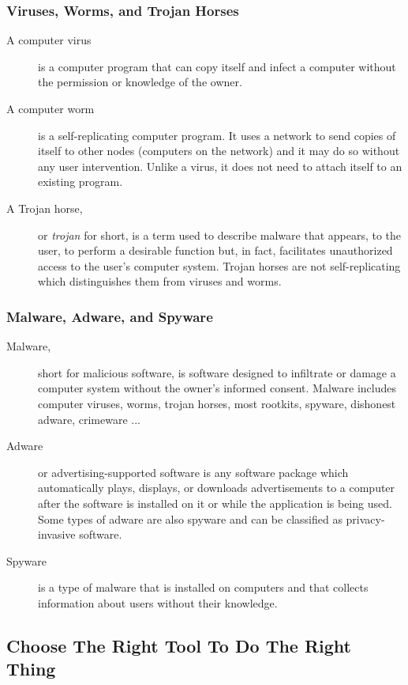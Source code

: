 \documentclass[hyperref={xetex,colorlinks,linkcolor=blue},green,compress]{beamer}
\begin{document}
\begin{frame}\frametitle{Viruses, Worms, and Trojan Horses}

\begin{description}
\item[A computer virus] is a computer program that can copy itself and infect a computer without the permission or knowledge of the owner.
\item[A computer worm] is a self-replicating computer program. It uses a network to send copies of itself to other nodes (computers on the network) and it may do so without any user intervention. Unlike a virus, it does not need to attach itself to an existing program.
\item[A Trojan horse,] or \emph{trojan} for short, is a term used to describe malware that appears, to the user, to perform a desirable function but, in fact, facilitates unauthorized access to the user's computer system. Trojan horses are not self-replicating which distinguishes them from viruses and worms. 
\end{description}

\end{frame}

\begin{frame}\frametitle{Malware, Adware, and Spyware}

\begin{description}
\item[Malware,] short for malicious software, is software designed to infiltrate or damage a computer system without the
  owner's informed consent. Malware includes computer viruses, worms, trojan horses, most rootkits, spyware, dishonest
  adware, crimeware ...
\item[Adware] or advertising-supported software is any software package which automatically plays, displays, or downloads advertisements to a computer after the software is installed on it or while the application is being used. Some types of adware are also spyware and can be classified as privacy-invasive software.
\item[Spyware] is a type of malware that is installed on computers and that collects information about users without their knowledge.
\end{description}

\end{frame}

\subsection[Browsers]{Choose The Right Tool To Do The Right Thing}
\label{sec:tools}
\end{document}
